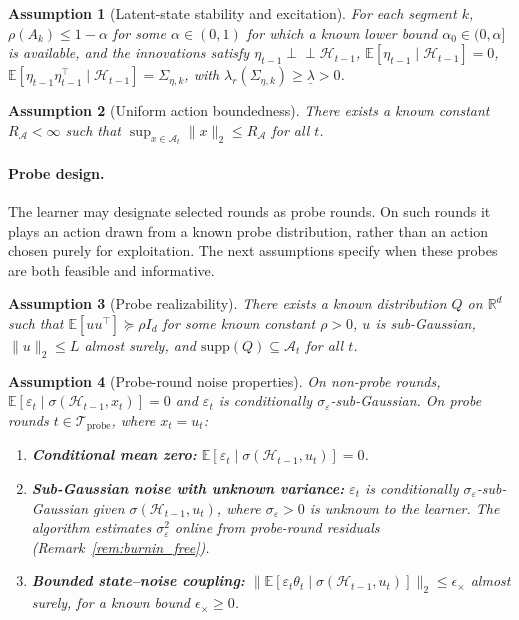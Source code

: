 \documentclass{article}
\newcommand{\R}{\mathbb{R}}
\newcommand{\E}{\mathbb{E}}
\newcommand{\cA}{\mathcal{A}}
\newcommand{\cH}{\mathcal{H}}
\newcommand{\cTprobe}{\mathcal{T}_{\mathrm{probe}}}
\newcommand{\supp}{\mathrm{supp}}
\newtheorem{assumption}{Assumption}
\begin{document}
\begin{assumption}[Latent-state stability and excitation]
\label{assum:latent_dynamics}
For each segment $k$, $\rho(A_k)\le 1-\alpha$ for some $\alpha\in(0,1)$ for which a known lower bound $\alpha_0\in(0,\alpha]$ is available, and the innovations satisfy
$\eta_{t-1}\perp\!\!\!\perp \cH_{t-1}$,
$\E[\eta_{t-1}\mid \cH_{t-1}] = 0$,
$\E[\eta_{t-1}\eta_{t-1}^\top \mid \cH_{t-1}] = \Sigma_{\eta,k}$,
with $\lambda_r(\Sigma_{\eta,k}) \ge \underline{\lambda} > 0$.
\end{assumption}

\begin{assumption}[Uniform action boundedness]
\label{assum:action_boundedness}
There exists a known constant $R_{\cA}<\infty$ such that
$\sup_{x\in\cA_t}\|x\|_2 \le R_{\cA}$ for all $t$.
\end{assumption}

\paragraph{Probe design.}
The learner may designate selected rounds as probe rounds.
On such rounds it plays an action drawn from a known probe distribution, rather than an action chosen purely for exploitation.
The next assumptions specify when these probes are both feasible and informative.

\begin{assumption}[Probe realizability]
\label{assum:probe_realizability}
There exists a known distribution $Q$ on $\R^d$ such that
$\E[uu^\top] \succeq \rho I_d$ for some known constant $\rho>0$,
$u$ is sub-Gaussian,
$\|u\|_2 \le L$ almost surely,
and $\supp(Q)\subseteq \cA_t$ for all $t$.
\end{assumption}

\begin{assumption}[Probe-round noise properties]
\label{assum:probe_noise}
On non-probe rounds, $\E[\varepsilon_t \mid \sigma(\cH_{t-1},x_t)] = 0$ and $\varepsilon_t$ is conditionally $\sigma_\varepsilon$-sub-Gaussian.
On probe rounds $t\in \cTprobe$, where $x_t = u_t$:
\begin{enumerate}[label=(\roman*)]
    \item \textbf{Conditional mean zero:}
    $\E[\varepsilon_t \mid \sigma(\cH_{t-1},u_t)] = 0$.
    \item \textbf{Sub-Gaussian noise with unknown variance:}
    $\varepsilon_t$ is conditionally $\sigma_\varepsilon$-sub-Gaussian given $\sigma(\cH_{t-1},u_t)$, where $\sigma_\varepsilon > 0$ is \emph{unknown} to the learner. The algorithm estimates $\sigma_\varepsilon^2$ online from probe-round residuals (Remark~\ref{rem:burnin_free}).
    \item \textbf{Bounded state--noise coupling:}
    $\bigl\|\E[\varepsilon_t \theta_t \mid \sigma(\cH_{t-1},u_t)]\bigr\|_2 \le \epsilon_\times$ almost surely, for a known bound $\epsilon_\times \ge 0$.
\end{enumerate}
\end{assumption}
\end{document}
